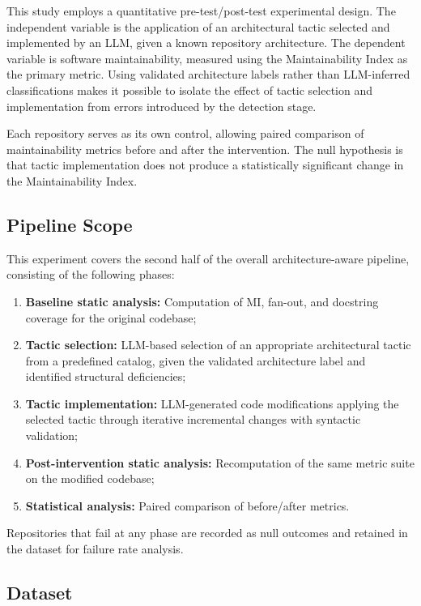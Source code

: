\documentclass[sigconf,review,anonymous]{acmart}
\begin{document}
This study employs a quantitative pre-test/post-test experimental design. The independent variable is the application of an architectural tactic selected and implemented by an LLM, given a known repository architecture. The dependent variable is software maintainability, measured using the Maintainability Index as the primary metric. Using validated architecture labels rather than LLM-inferred classifications makes it possible to isolate the effect of tactic selection and implementation from errors introduced by the detection stage.

Each repository serves as its own control, allowing paired comparison of maintainability metrics before and after the intervention. The null hypothesis is that tactic implementation does not produce a statistically significant change in the Maintainability Index.

\subsection{Pipeline Scope}

This experiment covers the second half of the overall architecture-aware pipeline, consisting of the following phases:

\begin{enumerate}[nosep]
    \item \textbf{Baseline static analysis:} Computation of MI, fan-out, and docstring coverage for the original codebase;
    \item \textbf{Tactic selection:} LLM-based selection of an appropriate architectural tactic from a predefined catalog, given the validated architecture label and identified structural deficiencies;
    \item \textbf{Tactic implementation:} LLM-generated code modifications applying the selected tactic through iterative incremental changes with syntactic validation;
    \item \textbf{Post-intervention static analysis:} Recomputation of the same metric suite on the modified codebase;
    \item \textbf{Statistical analysis:} Paired comparison of before/after metrics.
\end{enumerate}

Repositories that fail at any phase are recorded as null outcomes and retained in the dataset for failure rate analysis.

\subsection{Dataset}
\end{document}
